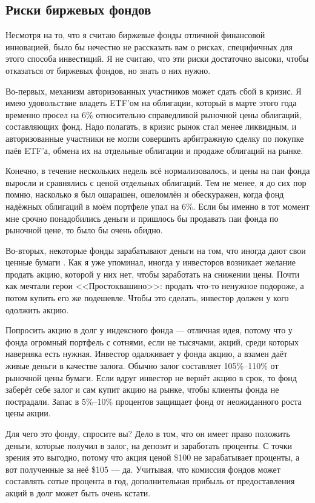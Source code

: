 \subsection{Риски биржевых фондов}

Несмотря на то, что я считаю биржевые фонды отличной финансовой инновацией, было бы нечестно не рассказать вам о рисках, специфичных для этого способа инвестиций. Я не считаю, что эти риски достаточно высоки, чтобы отказаться от биржевых фондов, но знать о них нужно.

Во-первых, механизм авторизованных участников может сдать сбой в кризис. Я имею удовольствие владеть ETF'ом на облигации, который в марте этого года временно просел на 6\% относительно справедливой рыночной цены облигаций, составляющих фонд. Надо полагать, в кризис рынок стал менее ликвидным, и авторизованные участники не могли совершить арбитражную сделку по покупке паёв ETF'а, обмена их на отдельные облигации и продаже облигаций на рынке.

Конечно, в течение нескольких недель всё нормализовалось, и цены на паи фонда выросли и сравнялись с ценой отдельных облигаций. Тем не менее, я до сих пор помню, насколько я был ошарашен, ошеломлён и обескуражен, когда фонд надёжных облигаций в моём портфеле упал на 6\%. Если бы именно в тот момент мне срочно понадобились деньги и пришлось бы продавать паи фонда по рыночной цене, то было бы очень обидно.

Во-вторых, некоторые фонды зарабатывают деньги на том, что иногда дают свои ценные бумаги . Как я уже упоминал, иногда у инвесторов возникает желание продать акцию, которой у них нет, чтобы заработать на снижении цены. Почти как мечтали герои <<Простоквашино>>: продать что-то ненужное подороже, а потом купить его же подешевле. Чтобы это сделать, инвестор должен у кого одолжить акцию.

Попросить акцию в долг у индексного фонда --- отличная идея, потому что у фонда огромный портфель с сотнями, если не тысячами, акций, среди которых наверняка есть нужная. Инвестор одалживает у фонда акцию, а взамен даёт живые деньги в качестве залога. Обычно залог составляет 105\%--110\% от рыночной цены бумаги. Если вдруг инвестор не вернёт акцию в срок, то фонд заберёт себе залог и сам купит акцию на рынке, чтобы клиенты фонда не пострадали. Запас в 5\%--10\% процентов защищает фонд от неожиданного роста цены акции.

Для чего это фонду, спросите вы? Дело в том, что он имеет право положить деньги, которые получил в залог, на депозит и заработать проценты. С точки зрения это выгодно, потому что акция ценой \$100 не зарабатывает проценты, а вот полученные за неё \$105 --- да. Учитывая, что комиссия фондов может составлять сотые процента в год, дополнительная прибыль от предоставления акций в долг может быть очень кстати.


